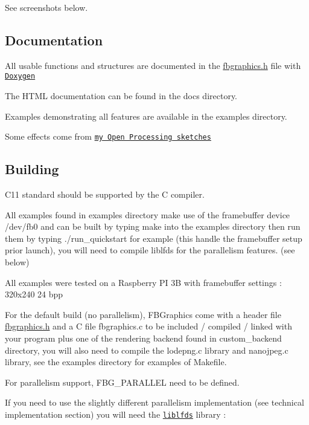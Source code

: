 See screenshots below.

\subsection*{Documentation}

All usable functions and structures are documented in the {\ttfamily \hyperlink{fbgraphics_8h}{fbgraphics.\+h}} file with \href{http://www.stack.nl/~dimitri/doxygen/}{\tt Doxygen}

The H\+T\+ML documentation can be found in the {\ttfamily docs} directory.

Examples demonstrating all features are available in the {\ttfamily examples} directory.

Some effects come from \href{https://www.openprocessing.org/user/130883#sketches}{\tt my Open Processing sketches}

\subsection*{Building}

C11 standard should be supported by the C compiler.

All examples found in {\ttfamily examples} directory make use of the framebuffer device {\ttfamily /dev/fb0} and can be built by typing {\ttfamily make} into the examples directory then run them by typing {\ttfamily ./run\+\_\+quickstart} for example (this handle the framebuffer setup prior launch), you will need to compile liblfds for the parallelism features. (see below)

All examples were tested on a Raspberry PI 3B with framebuffer settings \+: 320x240 24 bpp

For the default build (no parallelism), F\+B\+Graphics come with a header file {\ttfamily \hyperlink{fbgraphics_8h}{fbgraphics.\+h}} and a C file {\ttfamily fbgraphics.\+c} to be included / compiled / linked with your program plus one of the rendering backend found in {\ttfamily custom\+\_\+backend} directory, you will also need to compile the {\ttfamily lodepng.\+c} library and {\ttfamily nanojpeg.\+c} library, see the examples directory for examples of Makefile.

For parallelism support, {\ttfamily F\+B\+G\+\_\+\+P\+A\+R\+A\+L\+L\+EL} need to be defined.

If you need to use the slightly different parallelism implementation (see technical implementation section) you will need the \href{http://liblfds.org/}{\tt liblfds} library \+:


